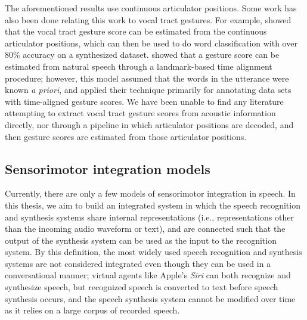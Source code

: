 The aforementioned results
use continuous articulator positions.
Some work has also been done
relating this work to
vocal tract gestures.
For example,
\citet{zhuang2008,zhuang2009}
showed that the vocal tract gesture score
can be estimated
from the continuous articulator positions,
which can then be used
to do word classification with
over 80\% accuracy on a synthesized dataset.
\citet{nam2010,nam2012}
showed that a gesture score
can be estimated from natural speech
through a landmark-based time alignment procedure;
however, this model assumed that the
words in the utterance were known \textit{a priori},
and applied their technique primarily
for annotating data sets with time-aligned gesture scores.
We have been unable to find any literature
attempting to extract vocal tract gesture scores
from acoustic information directly,
nor through a pipeline in which
articulator positions are decoded,
and then gesture scores are estimated
from those articulator positions.

\subsection{Sensorimotor integration models}
\label{sec:bg-diva-kroger}

Currently, there are only a few models
of sensorimotor integration in speech.
In this thesis, we aim to build
an integrated system
in which the speech recognition and synthesis
systems share internal representations
(i.e., representations other than
the incoming audio waveform or text),
and are connected such that
the output of the synthesis system
can be used as the input
to the recognition system.
By this definition,
the most widely used
speech recognition and synthesis systems
are not considered integrated
even though they can be used
in a conversational manner;
virtual agents like Apple's \textit{Siri}
can both recognize and synthesize speech,
but recognized speech is converted
to text before speech synthesis occurs,
and the speech synthesis system
cannot be modified over time
as it relies on a large corpus
of recorded speech.

